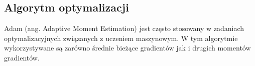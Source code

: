 \newpage
\subsection{Algorytm optymalizacji \cite{adam}}
Adam (ang. Adaptive Moment Estimation) jest często stosowany w zadaniach optymalizacyjnych związanych z uczeniem maszynowym.
W tym algorytmie wykorzystywane są zarówno średnie bieżące gradientów jak i drugich momentów gradientów.
